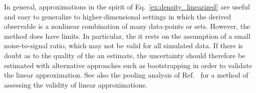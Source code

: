 %
%
%
%
%


In general, approximations in the spirit of Eq.~\ref{ex:density_linearized} are useful and easy to generalize to higher-dimensional settings in which the derived observable is a nonlinear combination of many data-points or sets.
However, the method does have limits.
In particular, the it rests on the assumption of a small noise-to-signal ratio, which may not be valid for all simulated data.
If there is doubt as to the quality of the an estimate, the uncertainty should therefore be estimated with alternative approaches such as bootstrapping in order to validate the linear approximation.
See also the pooling analysis of Ref.~\cite{patrone1} for a method of assessing the validity of linear approximations.



